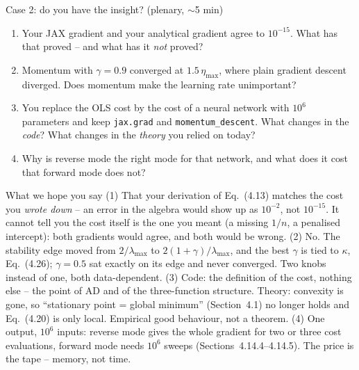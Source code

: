 \documentclass[10pt,aspectratio=169]{beamer}
\newcounter{insight}
\begin{document}
\begin{frame}{Case 2: do you have the insight?  (plenary, $\sim$5 min)}
\small
\begin{enumerate}
  \item Your JAX gradient and your analytical gradient agree to $10^{-15}$.
        What has that proved -- and what has it \emph{not} proved?
  \item Momentum with $\gamma=0.9$ converged at $1.5\,\eta_{\max}$, where plain
        gradient descent diverged.  Does momentum make the learning rate
        unimportant?
  \item You replace the OLS cost by the cost of a neural network with $10^6$
        parameters and keep \texttt{jax.grad} and \texttt{momentum\_descent}.
        What changes in the \emph{code}?  What changes in the \emph{theory}
        you relied on today?
  \item Why is reverse mode the right mode for that network, and what does it
        cost that forward mode does not?
\end{enumerate}
\pause
\begin{block}{What we hope you say}
\footnotesize
(1) That your derivation of Eq.~(4.13) matches the cost you \emph{wrote
down} -- an error in the algebra would show up as $10^{-2}$, not $10^{-15}$.
It cannot tell you the cost itself is the one you meant (a missing $1/n$, a
penalised intercept): both gradients would agree, and both would be wrong.
(2) No.  The stability edge moved from $2/\lambda_{\max}$ to
$2(1+\gamma)/\lambda_{\max}$, and the best $\gamma$ is tied to $\kappa$,
Eq.~(4.26); $\gamma=0.5$ sat exactly on its edge and never converged.  Two
knobs instead of one, both data-dependent.
(3) Code: the definition of the cost, nothing else -- the point of AD and of
the three-function structure.  Theory: convexity is gone, so ``stationary
point = global minimum'' (Section~4.1) no longer holds and Eq.~(4.20) is only
local.  Empirical good behaviour, not a theorem.
(4) One output, $10^{6}$ inputs: reverse mode gives the whole gradient for
two or three cost evaluations, forward mode needs $10^{6}$ sweeps
(Sections~4.14.4--4.14.5).  The price is the tape -- memory, not time.
\end{block}
\end{frame}
\end{document}
